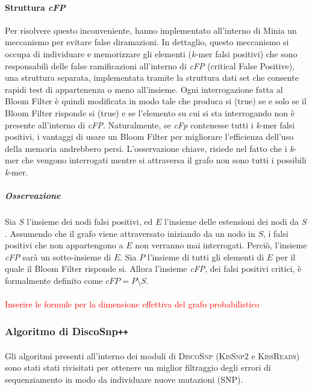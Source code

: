 \documentclass[../main.tex]{subfiles}
\begin{document}
\paragraph{Struttura \textit{cFP}} Per risolvere questo inconveniente,\cite{chikhi2013space} hanno implementato all'interno di Minia un meccanismo per evitare false diramazioni. In dettaglio, questo meccanismo si occupa di individuare e memorizzare gli elementi (\textit{k}-mer falsi positivi) che sono responsabili delle false ramificazioni all'interno di \textit{cFP} (critical False Positive), una struttura separata, implementata tramite la struttura dati set che consente rapidi test di appartenenza o meno all'insieme. Ogni interrogazione fatta al Bloom Filter è quindi modificata in modo tale che produca si (true) se e solo se il Bloom Filter risponde si (true) e se l'elemento su cui si sta interrogando non è presente all'interno di \textit{cFP}. Naturalmente, se \textit{cFp} contenesse tutti i \textit{k}-mer falsi positivi, i vantaggi di usare un Bloom Filter per migliorare l'efficienza dell'uso della memoria andrebbero persi. L'osservazione chiave, risiede nel fatto che i \textit{k}-mer che vengono interrogati mentre si attraversa il grafo non sono tutti i possibili \textit{k}-mer. 

\subparagraph{Osservazione} Sia $S$ l'insieme dei nodi falsi positivi, ed $E$ l'insieme delle estensioni dei nodi da $S$. Assumendo che il grafo viene attraversato iniziando da un nodo in $S$, i falsi positivi che non appartengono a $E$ non verranno mai interrogati. Perciò, l'insieme \textit{cFP} sarà un sotto-insieme di $E$. Sia $P$ l'insieme di tutti gli elementi di $E$ per il quale il Bloom Filter risponde si. Allora l'insieme \textit{cFP}, dei falsi positivi critici, è formalmente definito come $cFP = P \setminus S$.
\\\\
\textcolor{red}{Inserire le formule per la dimensione effettiva del grafo probabilistico}

\subsubsection{Algoritmo di DiscoSnp\texttt{++}}

\paragraph{} Gli algoritmi presenti all'interno dei moduli di \textsc{DiscoSnp} (\textsc{KisSnp2} e \textsc{KissReads}) sono stati stati rivisitati per ottenere un miglior filtraggio degli errori di sequenziamento in modo da individuare nuove mutazioni (SNP). 
\end{document}
